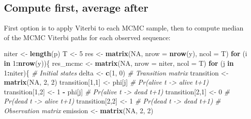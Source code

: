 \documentclass[
  12pt,
]{krantz}
\newenvironment{Shaded}{\begin{snugshade}}{\end{snugshade}}
\newcommand{\AttributeTok}[1]{\textcolor[rgb]{0.13,0.29,0.53}{#1}}
\newcommand{\CommentTok}[1]{\textcolor[rgb]{0.56,0.35,0.01}{\textit{#1}}}
\newcommand{\ConstantTok}[1]{\textcolor[rgb]{0.56,0.35,0.01}{#1}}
\newcommand{\ControlFlowTok}[1]{\textcolor[rgb]{0.13,0.29,0.53}{\textbf{#1}}}
\newcommand{\DecValTok}[1]{\textcolor[rgb]{0.00,0.00,0.81}{#1}}
\newcommand{\FunctionTok}[1]{\textcolor[rgb]{0.13,0.29,0.53}{\textbf{#1}}}
\newcommand{\NormalTok}[1]{#1}
\newcommand{\OtherTok}[1]{\textcolor[rgb]{0.56,0.35,0.01}{#1}}
\newcommand{\SpecialCharTok}[1]{\textcolor[rgb]{0.81,0.36,0.00}{\textbf{#1}}}
\begin{document}
\hypertarget{compute-average}{%
\subsection{Compute first, average after}\label{compute-average}}

First option is to apply Viterbi to each MCMC sample, then to compute median of the MCMC Viterbi paths for each observed sequence:

\begin{Shaded}
\begin{Highlighting}[]
\NormalTok{niter }\OtherTok{\textless{}{-}} \FunctionTok{length}\NormalTok{(p)}
\NormalTok{T }\OtherTok{\textless{}{-}} \DecValTok{5}
\NormalTok{res }\OtherTok{\textless{}{-}} \FunctionTok{matrix}\NormalTok{(}\ConstantTok{NA}\NormalTok{, }\AttributeTok{nrow =} \FunctionTok{nrow}\NormalTok{(y), }\AttributeTok{ncol =}\NormalTok{ T)}
\ControlFlowTok{for}\NormalTok{ (i }\ControlFlowTok{in} \DecValTok{1}\SpecialCharTok{:}\FunctionTok{nrow}\NormalTok{(y))\{}
\NormalTok{  res\_mcmc }\OtherTok{\textless{}{-}} \FunctionTok{matrix}\NormalTok{(}\ConstantTok{NA}\NormalTok{, }\AttributeTok{nrow =}\NormalTok{ niter, }\AttributeTok{ncol =}\NormalTok{ T)}
  \ControlFlowTok{for}\NormalTok{ (j }\ControlFlowTok{in} \DecValTok{1}\SpecialCharTok{:}\NormalTok{niter)\{}
    \CommentTok{\# Initial states}
\NormalTok{    delta }\OtherTok{\textless{}{-}} \FunctionTok{c}\NormalTok{(}\DecValTok{1}\NormalTok{, }\DecValTok{0}\NormalTok{)}
    \CommentTok{\# Transition matrix}
\NormalTok{    transition }\OtherTok{\textless{}{-}} \FunctionTok{matrix}\NormalTok{(}\ConstantTok{NA}\NormalTok{, }\DecValTok{2}\NormalTok{, }\DecValTok{2}\NormalTok{)}
\NormalTok{    transition[}\DecValTok{1}\NormalTok{,}\DecValTok{1}\NormalTok{] }\OtherTok{\textless{}{-}}\NormalTok{ phi[j]      }\CommentTok{\# Pr(alive t {-}\textgreater{} alive t+1)}
\NormalTok{    transition[}\DecValTok{1}\NormalTok{,}\DecValTok{2}\NormalTok{] }\OtherTok{\textless{}{-}} \DecValTok{1} \SpecialCharTok{{-}}\NormalTok{ phi[j]  }\CommentTok{\# Pr(alive t {-}\textgreater{} dead t+1)}
\NormalTok{    transition[}\DecValTok{2}\NormalTok{,}\DecValTok{1}\NormalTok{] }\OtherTok{\textless{}{-}} \DecValTok{0}        \CommentTok{\# Pr(dead t {-}\textgreater{} alive t+1)}
\NormalTok{    transition[}\DecValTok{2}\NormalTok{,}\DecValTok{2}\NormalTok{] }\OtherTok{\textless{}{-}} \DecValTok{1}        \CommentTok{\# Pr(dead t {-}\textgreater{} dead t+1)}
    \CommentTok{\# Observation matrix }
\NormalTok{    emission }\OtherTok{\textless{}{-}} \FunctionTok{matrix}\NormalTok{(}\ConstantTok{NA}\NormalTok{, }\DecValTok{2}\NormalTok{, }\DecValTok{2}\NormalTok{)}

\end{Highlighting}
\end{Shaded}
\end{document}
